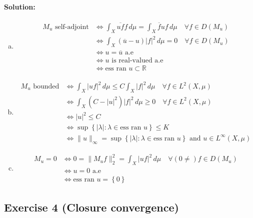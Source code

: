 \paragraph{Solution:}
\begin{enumerate}[(a)]
	\item
		\begin{equation*}
			\begin{aligned}
				M_{u}\text{ self-adjoint} &\iff \int_{X}\overline{uf}f\,d\mu = \int_{X}\overline{f}uf\,d\mu \quad \forall f\in D(M_{u})\\
				&\iff \int_{X}(\overline{u}-u)|f|^{2}\,d\mu = 0 \quad \forall f\in D(M_{u})\\
				&\iff u = \overline{u}\text{ a.e}\\
				&\iff u \text{ is real-valued a.e}\\
				&\iff \text{ess ran }u\subset\mathbb{R}
			\end{aligned}
		\end{equation*}
	\item
		\begin{equation*}
			\begin{aligned}
				M_{u} \text{ bounded} &\iff \int_{X}|uf|^{2}\,d\mu \leq C\int_{X}|f|^{2}\,d\mu \quad \forall f\in L^{2}(X,\mu)\\
				&\iff \int_{X}(C-|u|^{2})|f|^{2}\,d\mu\geq 0 \quad \forall f\in L^{2}(X,\mu)\\
				&\iff |u|^{2}\leq C\\
				&\iff \sup\left\{|\lambda|\colon \lambda\in\text{ess ran }u\right\}\leq K\\
				&\iff \|u\|_{\infty} = \sup\left\{|\lambda|\colon \lambda\in\text{ess ran }u\right\}\text{ and }u\in L^{\infty}(X,\mu)
			\end{aligned}
		\end{equation*}
	\item
		\begin{equation*}
			\begin{aligned}
				M_{u}=0 &\iff 0 = \|M_{u}f\|_{2}^{2} = \int_{X}|uf|^{2}\,d\mu \quad \forall (0\neq)f\in D(M_{u})\\
				&\iff u = 0 \text{ a.e}\\
				&\iff \text{ess ran }u = \left\{0\right\}
			\end{aligned}
		\end{equation*}
\end{enumerate}

\subsection{Exercise 4 (Closure convergence)}


